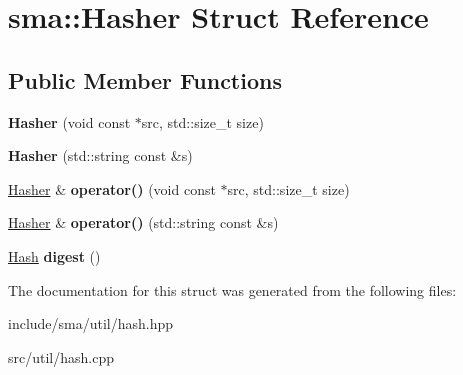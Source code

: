 \hypertarget{structsma_1_1Hasher}{\section{sma\-:\-:Hasher Struct Reference}
\label{structsma_1_1Hasher}
}
\subsection*{Public Member Functions}
\begin{DoxyCompactItemize}
\item 
\hypertarget{structsma_1_1Hasher_a67c7aadbafb52da2108eaba9a96a7a76}{{\bfseries Hasher} (void const $\ast$src, std\-::size\-\_\-t size)}\label{structsma_1_1Hasher_a67c7aadbafb52da2108eaba9a96a7a76}

\item 
\hypertarget{structsma_1_1Hasher_af45ac064b0f630f261734a08746b352c}{{\bfseries Hasher} (std\-::string const \&s)}\label{structsma_1_1Hasher_af45ac064b0f630f261734a08746b352c}

\item 
\hypertarget{structsma_1_1Hasher_a4eb29e4bc3bc23beca94d24193911068}{\hyperlink{structsma_1_1Hasher}{Hasher} \& {\bfseries operator()} (void const $\ast$src, std\-::size\-\_\-t size)}\label{structsma_1_1Hasher_a4eb29e4bc3bc23beca94d24193911068}

\item 
\hypertarget{structsma_1_1Hasher_af548182cff6ccaed07bc3a6fe33e4c14}{\hyperlink{structsma_1_1Hasher}{Hasher} \& {\bfseries operator()} (std\-::string const \&s)}\label{structsma_1_1Hasher_af548182cff6ccaed07bc3a6fe33e4c14}

\item 
\hypertarget{structsma_1_1Hasher_ae2b0b4ba4202709e6e37148aef92c420}{\hyperlink{structsma_1_1Hash}{Hash} {\bfseries digest} ()}\label{structsma_1_1Hasher_ae2b0b4ba4202709e6e37148aef92c420}

\end{DoxyCompactItemize}


The documentation for this struct was generated from the following files\-:\begin{DoxyCompactItemize}
\item 
include/sma/util/hash.\-hpp\item 
src/util/hash.\-cpp\end{DoxyCompactItemize}
